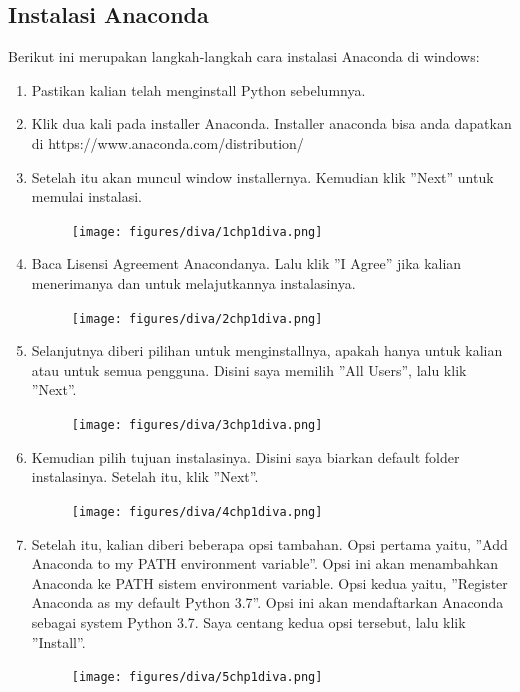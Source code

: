 \subsection{Instalasi Anaconda}
Berikut ini merupakan langkah-langkah cara instalasi Anaconda di windows:
\begin{enumerate}
	\item Pastikan kalian telah menginstall Python sebelumnya.
	\item Klik dua kali pada installer Anaconda. Installer anaconda bisa anda dapatkan di https://www.anaconda.com/distribution/
	\item Setelah itu akan muncul window installernya. Kemudian klik ''Next'' untuk memulai instalasi.
	\begin{figure}[H]
		\texttt{[image: figures/diva/1chp1diva.png]}
		\centering
	\end{figure}

	\item Baca Lisensi Agreement Anacondanya. Lalu klik ''I Agree'' jika kalian menerimanya dan untuk melajutkannya instalasinya.
	\begin{figure}[H]
		\texttt{[image: figures/diva/2chp1diva.png]}
		\centering
	\end{figure}

	\item Selanjutnya diberi pilihan untuk menginstallnya, apakah hanya untuk kalian atau untuk semua pengguna. Disini saya memilih ''All Users'', lalu klik ''Next''.
	\begin{figure}[H]
		\texttt{[image: figures/diva/3chp1diva.png]}
		\centering
	\end{figure}

	\item Kemudian pilih tujuan instalasinya. Disini saya biarkan default folder instalasinya. Setelah itu, klik ''Next''.
	\begin{figure}[H]
		\texttt{[image: figures/diva/4chp1diva.png]}
		\centering
	\end{figure}

	\item Setelah itu, kalian diberi beberapa opsi tambahan. Opsi pertama yaitu, ''Add Anaconda to my PATH environment variable''. Opsi ini akan menambahkan Anaconda ke PATH sistem environment variable. Opsi kedua yaitu, ''Register Anaconda as my default Python 3.7''. Opsi ini akan mendaftarkan Anaconda sebagai system Python 3.7. Saya centang kedua opsi tersebut, lalu klik ''Install''.
	\begin{figure}[H]
		\texttt{[image: figures/diva/5chp1diva.png]}
		\centering
	\end{figure}


\end{enumerate}
